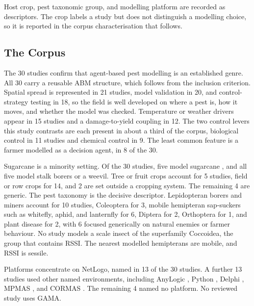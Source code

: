 Host crop, pest taxonomic group, and modelling platform are recorded as descriptors. The crop labels a study but does not distinguish a modelling choice, so it is reported in the corpus characterisation that follows.

\subsection{The Corpus}

The 30 studies confirm that agent-based pest modelling is an established genre. All 30 carry a reusable ABM structure, which follows from the inclusion criterion. Spatial spread is represented in 21 studies, model validation in 20, and control-strategy testing in 18, so the field is well developed on where a pest is, how it moves, and whether the model was checked. Temperature or weather drivers appear in 15 studies and a damage-to-yield coupling in 12. The two control levers this study contrasts are each present in about a third of the corpus, biological control in 11 studies and chemical control in 9. The least common feature is a farmer modelled as a decision agent, in 8 of the 30.

Sugarcane is a minority setting. Of the 30 studies, five model sugarcane \citep{Alves2024,Alves2026,vanVuuren2018,Human2023,Potgieter2025}, and all five model stalk borers or a weevil. Tree or fruit crops account for 5 studies, field or row crops for 14, and 2 are set outside a cropping system. The remaining 4 are generic. The pest taxonomy is the decisive descriptor. Lepidopteran borers and miners account for 10 studies, Coleoptera for 3, mobile hemipteran sap-suckers such as whitefly, aphid, and lanternfly for 6, Diptera for 2, Orthoptera for 1, and plant disease for 2, with 6 focused generically on natural enemies or farmer behaviour. No study models a scale insect of the superfamily Coccoidea, the group that contains RSSI. The nearest modelled hemipterans are mobile, and RSSI is sessile.

Platforms concentrate on NetLogo, named in 13 of the 30 studies. A further 13 studies used other named environments, including AnyLogic \citep{vanVuuren2018}, Python \citep{Human2023,Potgieter2025}, Delphi \citep{Gergs2026}, MPMAS \citep{Grovermann2017}, and CORMAS \citep{Rebaudo2011,RebaudoDangles2011}. The remaining 4 named no platform. No reviewed study uses GAMA.

